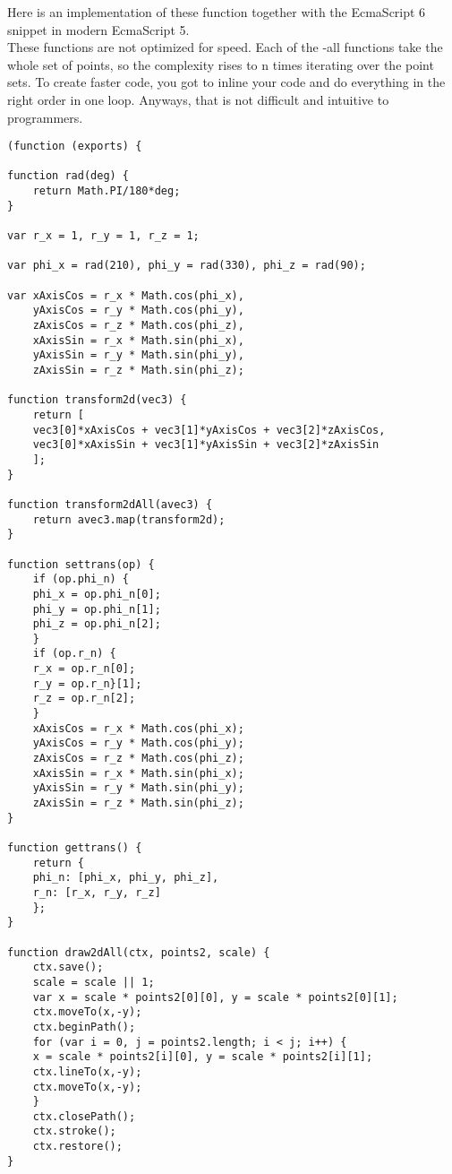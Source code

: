 \documentclass[a4paper]{article}
\begin{document}
\begin{PropositionOpt4}
Here is an implementation of these function together with the EcmaScript 6 snippet in modern EcmaScript 5.\\

These functions are not optimized for speed. Each of the -all functions take the whole set of points, so 
the complexity rises to n times iterating over the point sets. To create faster code, you got to inline your
code and do everything in the right order in one loop. Anyways, that is not difficult and intuitive to programmers.\\


\begin{lstlisting}
(function (exports) {

function rad(deg) { 
    return Math.PI/180*deg; 
}

var r_x = 1, r_y = 1, r_z = 1;

var phi_x = rad(210), phi_y = rad(330), phi_z = rad(90);

var xAxisCos = r_x * Math.cos(phi_x),
    yAxisCos = r_y * Math.cos(phi_y),
    zAxisCos = r_z * Math.cos(phi_z),
    xAxisSin = r_x * Math.sin(phi_x),
    yAxisSin = r_y * Math.sin(phi_y),
    zAxisSin = r_z * Math.sin(phi_z);

function transform2d(vec3) {
    return [
    vec3[0]*xAxisCos + vec3[1]*yAxisCos + vec3[2]*zAxisCos,
    vec3[0]*xAxisSin + vec3[1]*yAxisSin + vec3[2]*zAxisSin
    ];
}

function transform2dAll(avec3) {
    return avec3.map(transform2d);
}

function settrans(op) {
    if (op.phi_n) {
    phi_x = op.phi_n[0];
    phi_y = op.phi_n[1];
    phi_z = op.phi_n[2];
    }
    if (op.r_n) {
    r_x = op.r_n[0];
    r_y = op.r_n}[1];
    r_z = op.r_n[2];
    }
    xAxisCos = r_x * Math.cos(phi_x);
    yAxisCos = r_y * Math.cos(phi_y);
    zAxisCos = r_z * Math.cos(phi_z);
    xAxisSin = r_x * Math.sin(phi_x);
    yAxisSin = r_y * Math.sin(phi_y);
    zAxisSin = r_z * Math.sin(phi_z);
}

function gettrans() { 
    return { 
    phi_n: [phi_x, phi_y, phi_z], 
    r_n: [r_x, r_y, r_z] 
    }; 
}

function draw2dAll(ctx, points2, scale) {
    ctx.save();
    scale = scale || 1;
    var x = scale * points2[0][0], y = scale * points2[0][1];
    ctx.moveTo(x,-y);
    ctx.beginPath();
    for (var i = 0, j = points2.length; i < j; i++) {
    x = scale * points2[i][0], y = scale * points2[i][1];
    ctx.lineTo(x,-y);
    ctx.moveTo(x,-y);
    }
    ctx.closePath();
    ctx.stroke();
    ctx.restore();
}


\end{lstlisting}
\end{PropositionOpt4}
\end{document}
